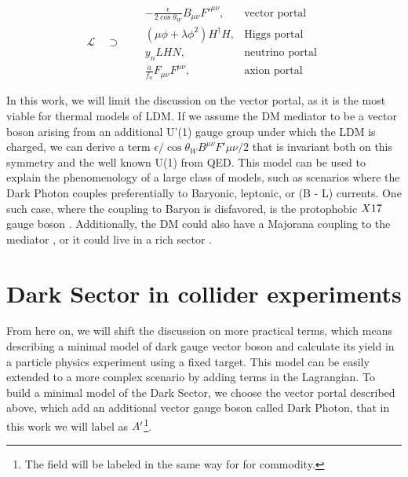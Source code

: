 \begin{equation}
  \label{eq:dm-portals}
  \mathcal{L} \quad \supset \quad
\begin{aligned}
  &-\frac{\epsilon}{2 \cos{\theta_W}}B_{\mu \nu}F'^{\mu \nu}, &\textrm{vector portal}\\
  & (\mu \phi + \lambda \phi^2)H^{\dagger}H, &\textrm{Higgs portal}\\
  &y_n LHN, &\textrm{neutrino portal} \\
  &\frac{a}{f_a} F_{\mu \nu} F^{\mu \nu}, &\textrm{axion portal}
\end{aligned}
\end{equation}

In this work, we will limit the discussion on the vector portal, as it is the most viable for thermal models of LDM. If we assume the DM mediator to be a vector boson arising from an additional U'(1) gauge group under which the LDM is charged, we can derive a term $\epsilon / \cos{\theta_W} B^{\mu \nu} F'{\mu \nu}/2$ that is invariant both on this symmetry and the well known U(1) from QED. This model can be used to explain the phenomenology of a large class of models, such as scenarios where the Dark Photon couples preferentially to Baryonic, leptonic, or (B - L) currents. One such case, where the coupling to Baryon is disfavored, is the protophobic $X17$ gauge boson \cite{PhysRevD.95.035017}. Additionally, the DM could also have a Majorana coupling to the mediator \cite{PhysRevD.93.063523}, or it could live in a rich sector \cite{Morrissey_2014}.

\section{Dark Sector in collider experiments}
\label{ch1:sec:dm-colliders}

From here on, we will shift the discussion on more practical terms, which means describing a minimal model of dark gauge vector boson and calculate its yield in a particle physics experiment using a fixed target. This model can be easily extended to a more complex scenario by adding terms in the Lagrangian. To build a minimal model of the Dark Sector, we choose the vector portal described above, which add an additional vector gauge boson called Dark Photon, that in this work we will label as $A'$\footnote{The field will be labeled in the same way for for commodity.}.

